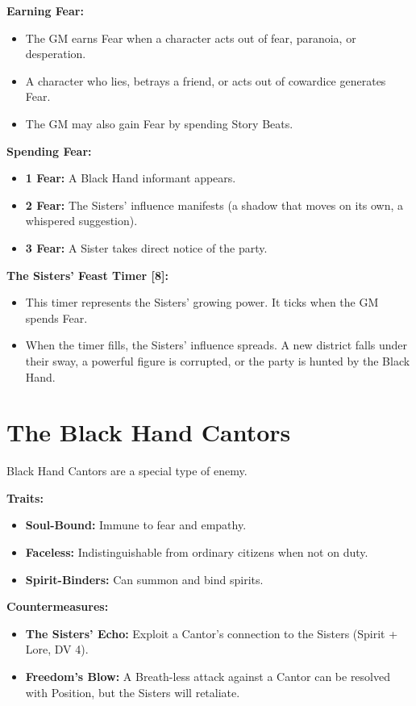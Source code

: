 \documentclass[11pt,twoside]{book}
\newenvironment{mechanicbox}{\begin{mdframed}[style=mechanicbox]}{\end{mdframed}}
\begin{document}
\begin{mechanicbox}
\textbf{Earning Fear:}
\begin{itemize}
    \item The GM earns Fear when a character acts out of fear, paranoia, or desperation.
    \item A character who lies, betrays a friend, or acts out of cowardice generates Fear.
    \item The GM may also gain Fear by spending Story Beats.
\end{itemize}

\textbf{Spending Fear:}
\begin{itemize}
    \item \textbf{1 Fear:} A Black Hand informant appears.
    \item \textbf{2 Fear:} The Sisters' influence manifests (a shadow that moves on its own, a whispered suggestion).
    \item \textbf{3 Fear:} A Sister takes direct notice of the party.
\end{itemize}

\textbf{The Sisters' Feast Timer [8]:}
\begin{itemize}
    \item This timer represents the Sisters' growing power. It ticks when the GM spends Fear.
    \item When the timer fills, the Sisters' influence spreads. A new district falls under their sway, a powerful figure is corrupted, or the party is hunted by the Black Hand.
\end{itemize}
\end{mechanicbox}

\section{The Black Hand Cantors}

Black Hand Cantors are a special type of enemy.

\begin{mechanicbox}
\textbf{Traits:}
\begin{itemize}
    \item \textbf{Soul-Bound:} Immune to fear and empathy.
    \item \textbf{Faceless:} Indistinguishable from ordinary citizens when not on duty.
    \item \textbf{Spirit-Binders:} Can summon and bind spirits.
\end{itemize}

\textbf{Countermeasures:}
\begin{itemize}
    \item \textbf{The Sisters' Echo:} Exploit a Cantor's connection to the Sisters (Spirit + Lore, DV 4).
    \item \textbf{Freedom's Blow:} A Breath-less attack against a Cantor can be resolved with Position, but the Sisters will retaliate.
\end{itemize}
\end{mechanicbox}
\end{document}
